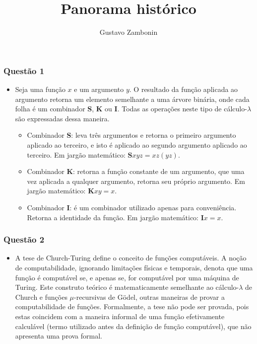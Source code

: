 \documentclass{../sftex/sftex}
\title{Panorama histórico}
\author{Gustavo Zambonin}
\begin{document}
\maketitle

\subsubsection*{Questão 1}
\begin{itemize}
    \item Seja uma função $x$ e um argumento $y$. O resultado da função aplicada
    ao argumento retorna um elemento semelhante a uma árvore binária, onde cada
    folha é um combinador \textbf{S}, \textbf{K} ou \textbf{I}. Todas as
    operações neste tipo de cálculo-$\lambda$ são expressadas dessa maneira.

    \begin{itemize}
        \item Combinador \textbf{S}: leva três argumentos e retorna o primeiro
        argumento aplicado ao terceiro, e isto é aplicado ao segundo argumento
        aplicado ao terceiro. Em jargão matemático: $\textbf{S}xyz = xz(yz)$.

        \item Combinador \textbf{K}: retorna a função constante de um argumento,
        que uma vez aplicada a qualquer argumento, retorna seu próprio
        argumento. Em jargão matemático: $\textbf{K}xy = x$.

        \item Combinador \textbf{I}: é um combinador utilizado apenas para
        conveniência. Retorna a identidade da função. Em jargão matemático:
        $\textbf{I}x = x$.
    \end{itemize}
\end{itemize}

\subsubsection*{Questão 2}
\begin{itemize}
    \item A tese de Church-Turing define o conceito de funções computáveis. A
    noção de computabilidade, ignorando limitações físicas e temporais, denota
    que uma função é computável se, e apenas se, for computável por uma máquina
    de Turing. Este construto teórico é matematicamente semelhante ao
    cálculo-$\lambda$ de Church e funções $\mu$-recursivas de Gödel, outras
    maneiras de provar a computabilidade de funções. Formalmente, a tese não
    pode ser provada, pois estas coincidem com a maneira informal de uma função
    efetivamente calculável (termo utilizado antes da definição de função
    computável), que não apresenta uma prova formal.
\end{itemize}
\end{document}
